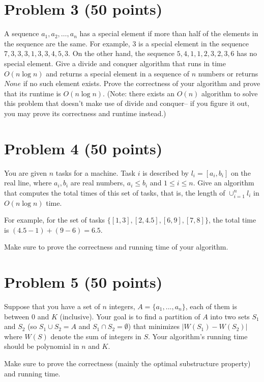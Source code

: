 \documentclass[letterpaper, 11pt]{article}
\begin{document}
\newpage

\section{Problem 3 (50 points)}
A sequence $a_1, a_2, \ldots, a_n$ has a special element if more than half of the elements
in the sequence are the same. For example, $3$ is a special element in the sequence
$7, 3, 3, 3, 1, 3, 3, 4, 5, 3$. On the other hand, the sequence $5, 4, 1, 1, 2, 3, 2, 3, 6$ has
no special element. Give a divide and conquer algorithm that runs in time
$O(n \log n)$ and returns a special element in a sequence of $n$ numbers
or returns $None$ if no such element exists. Prove the correctness of your algorithm
and prove that its runtime is $O(n\log n)$. (Note: there exists an $O(n)$ algorithm to
solve this problem that doesn’t make use of divide and conquer– if you figure it
out, you may prove its correctness and runtime instead.)





\newpage

\section{Problem 4 (50 points)}
You are given $n$ tasks for a machine. Task $i$ is described by $l_i = [a_i, b_i]$ on the real line, where $a_i, b_i$ are real numbers, $a_i \leq b_i$ and $1 \leq i \leq n$. Give an algorithm that computes the total times of this set of tasks,
that is, the length of $\cup_{i=1}^{n}l_i$ in $O(n\log n)$ time.


For example, for the set of tasks $\{[1,3], [2 ,4.5], [6, 9], [7,8]\}$, the total time is $(4.5 - 1) + (9-6) = 6.5$.

Make sure to prove the correctness and running time of your algorithm. 





\newpage
\section{Problem 5 (50 points)}

Suppose that you have a set of $n$ integers, $A = \{a_1, . . . , a_n\}$, each of them is between $0$ and $K$ (inclusive). Your goal is to find
a partition of $A$ into two sets $S_1$ and $S_2$ (so $S_1\cup S_2 = A$ and $S_1\cap S_2 = \emptyset$)
that minimizes $|W(S_1)-W(S_2)|$ where $W(S)$ denote the sum of integers in $S$. Your algorithm's running time should be polynomial in $n$ and $K$.

Make sure to prove the correctness (mainly the optimal substructure property) and running time. 
\end{document}
